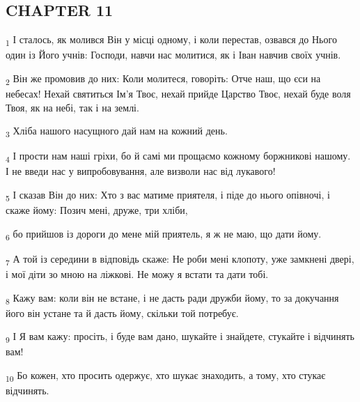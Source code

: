 \subsection{CHAPTER 11}
\begin{tcolorbox}
\textsubscript{1} І сталось, як молився Він у місці одному, і коли перестав, озвався до Нього один із Його учнів: Господи, навчи нас молитися, як і Іван навчив своїх учнів.
\end{tcolorbox}
\begin{tcolorbox}
\textsubscript{2} Він же промовив до них: Коли молитеся, говоріть: Отче наш, що єси на небесах! Нехай святиться Ім'я Твоє, нехай прийде Царство Твоє, нехай буде воля Твоя, як на небі, так і на землі.
\end{tcolorbox}
\begin{tcolorbox}
\textsubscript{3} Хліба нашого насущного дай нам на кожний день.
\end{tcolorbox}
\begin{tcolorbox}
\textsubscript{4} І прости нам наші гріхи, бо й самі ми прощаємо кожному боржникові нашому. І не введи нас у випробовування, але визволи нас від лукавого!
\end{tcolorbox}
\begin{tcolorbox}
\textsubscript{5} І сказав Він до них: Хто з вас матиме приятеля, і піде до нього опівночі, і скаже йому: Позич мені, друже, три хліби,
\end{tcolorbox}
\begin{tcolorbox}
\textsubscript{6} бо прийшов із дороги до мене мій приятель, я ж не маю, що дати йому.
\end{tcolorbox}
\begin{tcolorbox}
\textsubscript{7} А той із середини в відповідь скаже: Не роби мені клопоту, уже замкнені двері, і мої діти зо мною на ліжкові. Не можу я встати та дати тобі.
\end{tcolorbox}
\begin{tcolorbox}
\textsubscript{8} Кажу вам: коли він не встане, і не дасть ради дружби йому, то за докучання його він устане та й дасть йому, скільки той потребує.
\end{tcolorbox}
\begin{tcolorbox}
\textsubscript{9} І Я вам кажу: просіть, і буде вам дано, шукайте і знайдете, стукайте і відчинять вам!
\end{tcolorbox}
\begin{tcolorbox}
\textsubscript{10} Бо кожен, хто просить одержує, хто шукає знаходить, а тому, хто стукає відчинять.
\end{tcolorbox}
